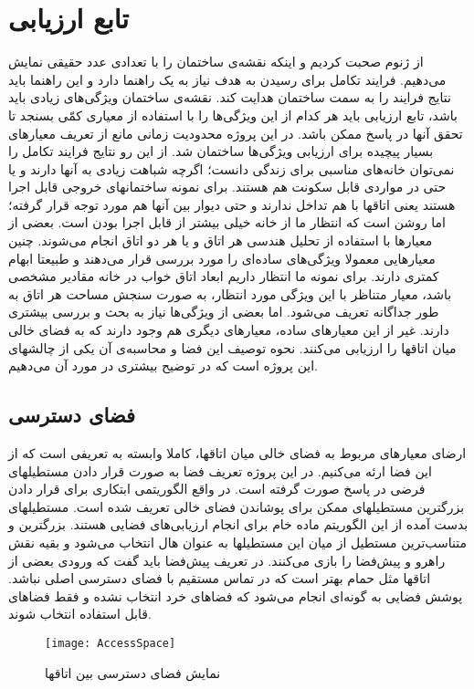 \documentclass{report}
\begin{document}
\section{تابع ارزیابی}
از ژنوم صحبت کردیم و اینکه نقشه‌ی ساختمان را با تعدادی عدد حقیقی نمایش می‌دهیم. فرایند تکامل برای رسیدن به هدف نیاز به یک راهنما دارد و این راهنما باید نتایج فرایند را به سمت ساختمان هدایت کند. نقشه‌ی ساختمان ویژگی‌های زیادی باید باشد، تابع ارزیابی باید هر کدام از این ویژگی‌ها را با استفاده از معیاری کمّی بسنجد تا تحقق آنها در پاسخ ممکن باشد.
در این پروژه محدودیت زمانی مانع از تعریف معیارهای بسیار پیچیده برای ارزیابی ویژگی‌ها ساختمان شد. از این رو نتایج فرایند تکامل را نمی‌توان خانه‌های مناسبی برای زندگی دانست؛ اگرچه شباهت زیادی به آنها دارند و یا حتی در مواردی قابل سکونت هم هستند. برای نمونه ساختمانهای خروجی قابل اجرا هستند یعنی اتاقها با هم تداخل ندارند و حتی دیوار بین آنها هم مورد توجه قرار گرفته؛ اما روشن است که انتظار ما از خانه خیلی بیشتر از قابل اجرا بودن است.
بعضی از معیارها با استفاده از تحلیل هندسی هر اتاق و یا هر دو اتاق انجام می‌شوند. چنین معیارهایی معمولا ویژگی‌های ساده‌ای را مورد بررسی قرار می‌دهند و طبیعتا ابهام کمتری دارند. برای نمونه ما انتظار داریم ابعاد اتاق خواب در خانه مقادیر مشخصی باشد، معیار متناظر با این ويژگی مورد انتظار، به صورت سنجش مساحت هر اتاق به طور جداگانه تعریف می‌شود. اما بعضی از ویژگی‌ها نیاز به بحث و بررسی بیشتری دارند.
غیر از این معیارهای ساده، معیارهای دیگری هم وجود دارند که به فضای خالی میان اتاقها را ارزیابی می‌کنند. نحوه توصیف این فضا و محاسبه‌ی آن یکی از چالشهای این پروژه است که در توضیح بیشتری در مورد آن می‌دهیم.

\subsection{فضای دسترسی}
ارضای معیارهای مربوط به فضای خالی میان اتاقها، کاملا وابسته به تعریفی است که از این فضا ارئه می‌کنیم. در این پروژه تعریف فضا به صورت قرار دادن مستطیلهای فرضی در پاسخ صورت گرفته است. در واقع الگوریتمی ابتکاری برای قرار دادن بزرگترین مستطیلهای ممکن برای پوشاندن فضای خالی تعریف شده است. مستطیلهای بدست آمده از این الگوریتم ماده خام برای انجام ارزیابی‌های فضایی هستند. بزرگترین و متناسب‌ترین مستطیل از میان این مستطیلها به عنوان هال انتخاب می‌شود و بقیه نقش راهرو و پیش‌فضا را بازی می‌کنند. در تعریف پیش‌فضا باید گفت که ورودی بعضی از اتاقها مثل حمام بهتر است که در تماس مستقیم با فضای دسترسی اصلی نباشد. پوشش فضایی به گونه‌ای انجام می‌شود که فضاهای خرد انتخاب نشده و فقط فضاهای قابل استفاده انتخاب شوند. 
\begin{figure}[h] \centerline{\texttt{[image: AccessSpace]}} \caption{\label{fAccessSpace}
 نمایش فضای دسترسی بین اتاقها
 } \end{figure}
\end{document}
